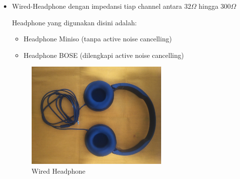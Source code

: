 \documentclass[12pt,]{article}
\begin{document}
\begin{itemize}
		\item Wired-Headphone dengan impedansi tiap channel antara $32\Omega$ hingga $300\Omega$

		Headphone yang digunakan disini adalah:
		\begin{itemize}
			\item Headphone Miniso (tanpa active noise cancelling)
			\item Headphone BOSE (dilengkapi active noise cancelling)
		\end{itemize}
		\begin{figure}[!ht]
			\centering
			\includegraphics[width=200pt]{images/foto/phone}
			\caption{Wired Headphone}
		\end{figure}


\end{itemize}
\end{document}
